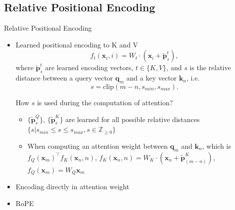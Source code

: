 \documentclass{beamer}
\newcommand{\transpose}{^{\top}}
\begin{document}
	\subsection{Relative Positional Encoding}
	\begin{frame}{Relative Positional Encoding}
		\begin{itemize}
			\item Learned positional encoding to K and V
			\begin{equation}\label{eqn:rel_pos_enc_func}
				f_t(\mathbf{x}_i, i) = W_t \cdot (\mathbf{x}_i + \widetilde{\mathbf{p}}_s^t),
			\end{equation}
			where $\tilde{\mathbf{p}}_s^t$ are learned encoding vectors, $t\in \{K, V\}$, and $s$ is the relative distance between a query vector $\mathbf{q}_m$ and a key vector $\mathbf{k}_n$, i.e.
			\begin{equation}\label{eqn:rel_pos_enc_func_qk_dist}
				s = \text{clip}(m-n, s_{min}, s_{max}).
			\end{equation}				
			\begin{block}{How $s$ is used during the computation of attention?}
				\begin{itemize}
					\item $\{\widetilde{\mathbf{p}}_s^Q\}$, $\{\widetilde{\mathbf{p}}_s^K\}$ are learned for all possible relative distances $\{s|s_{min} \le s \le s_{max}, s\in \mathbb{Z}_{\geq 0}\}$
					\item When computing an attention weight between $\mathbf{q}_m$ and $\mathbf{k}_n$, which is $f_Q(\mathbf{x}_m)\transpose f_K(\mathbf{x}_n, n)$, $f_K(\mathbf{x}_n, n) = W_K \cdot (\mathbf{x}_n + \widetilde{\mathbf{p}}_{(m-n)}^K)$, $f_Q(\mathbf{x}_m) = W_Q\mathbf{x}_m$											
				\end{itemize}					
			\end{block}
			\item Encoding directly in attention weight
			\item RoPE
		\end{itemize}
	\end{frame}
	
\end{document}
